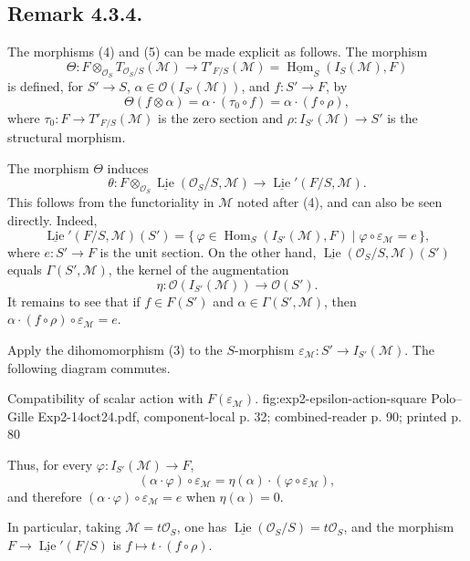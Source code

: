 \subsection*{Remark 4.3.4.}
The morphisms (4) and (5) can be made explicit as follows. The morphism
\[
 \Theta:F\otimes_{\mathcal O_S}T_{\mathcal O_S/S}(\mathcal M)
 \longrightarrow T'_{F/S}(\mathcal M)
 =\underline{\operatorname{Hom}}_S(I_S(\mathcal M),F)
\]
is defined, for \(S'\to S\),
\(\alpha\in\mathcal O(I_{S'}(\mathcal M))\), and \(f:S'\to F\), by
\[
 \Theta(f\otimes\alpha)
 =\alpha\cdot(\tau_0\circ f)
 =\alpha\cdot(f\circ\rho),
\]
where \(\tau_0:F\to T'_{F/S}(\mathcal M)\) is the zero section and
\(\rho:I_{S'}(\mathcal M)\to S'\) is the structural morphism.

The morphism \(\Theta\) induces
\[
 \theta:F\otimes_{\mathcal O_S}
 \underline{\operatorname{Lie}}(\mathcal O_S/S,\mathcal M)
 \longrightarrow
 \underline{\operatorname{Lie}}'(F/S,\mathcal M).
\]
This follows from the functoriality in \(\mathcal M\) noted after (4),
and can also be seen directly. Indeed,
\[
 \underline{\operatorname{Lie}}'(F/S,\mathcal M)(S')
 =\{\,\varphi\in\operatorname{Hom}_S(I_{S'}(\mathcal M),F)
       \mid \varphi\circ\varepsilon_{\mathcal M}=e\,\},
\]
where \(e:S'\to F\) is the unit section. On the other hand,
\(\underline{\operatorname{Lie}}(\mathcal O_S/S,\mathcal M)(S')\)
equals \(\Gamma(S',\mathcal M)\), the kernel of the augmentation
\[
 \eta:\mathcal O(I_{S'}(\mathcal M))\longrightarrow\mathcal O(S').
\]
It remains to see that if \(f\in F(S')\) and
\(\alpha\in\Gamma(S',\mathcal M)\), then
\(\alpha\cdot(f\circ\rho)\circ\varepsilon_{\mathcal M}=e\).

Apply the dihomomorphism (3) to the \(S\)-morphism
\(\varepsilon_{\mathcal M}:S'\to I_{S'}(\mathcal M)\). The following
diagram commutes.

  {Compatibility of scalar action with
  \(F(\varepsilon_{\mathcal M})\).}
  {fig:exp2-epsilon-action-square}
  {Polo--Gille Exp2-14oct24.pdf, component-local p. 32; combined-reader p. 90; printed p. 80}

Thus, for every \(\varphi:I_{S'}(\mathcal M)\to F\),
\[
 (\alpha\cdot\varphi)\circ\varepsilon_{\mathcal M}
 =\eta(\alpha)\cdot(\varphi\circ\varepsilon_{\mathcal M}),
\]
and therefore
\((\alpha\cdot\varphi)\circ\varepsilon_{\mathcal M}=e\) when
\(\eta(\alpha)=0\).

In particular, taking \(\mathcal M=t\mathcal O_S\), one has
\(\underline{\operatorname{Lie}}(\mathcal O_S/S)=t\mathcal O_S\), and
the morphism \(F\to\underline{\operatorname{Lie}}'(F/S)\) is
\(f\mapsto t\cdot(f\circ\rho)\).

